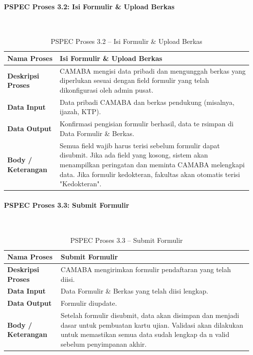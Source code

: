 \paragraph{PSPEC Proses 3.2: Isi Formulir \& Upload Berkas}~\\
\begin{longtable}{|p{}|p{}|}
	\caption{PSPEC Proses 3.2 -- Isi Formulir \& Upload Berkas}
	\label{table:3.pspec32}\\
	\hline
	\textbf{Nama Proses} & Isi Formulir \& Upload Berkas \\
	\hline
	\textbf{Deskripsi Proses} & CAMABA mengisi data pribadi dan mengunggah berkas yang diperlukan sesuai dengan field formulir yang telah dikonfigurasi oleh admin pusat. \\
	\hline
	\textbf{Data Input} & Data pribadi CAMABA dan berkas pendukung (misalnya, ijazah, KTP). \\
	\hline
	\textbf{Data Output} & Konfirmasi pengisian formulir berhasil, data te rsimpan di Data Formulir \& Berkas. \\
	\hline
	\textbf{Body / Keterangan} & Semua field wajib harus terisi sebelum formulir dapat disubmit. Jika ada field yang kosong, sistem akan menampilkan peringatan dan meminta CAMABA melengkapi data. Jika formulir kedokteran, fakultas akan otomatis terisi "Kedokteran". \\
	\hline
\end{longtable}


\paragraph{PSPEC Proses 3.3: Submit Formulir}~\\
\begin{longtable}{|p{}|p{}|}
	\caption{PSPEC Proses 3.3 -- Submit Formulir}
	\label{table:3.pspec33}\\
	\hline
	\textbf{Nama Proses} & Submit Formulir \\
	\hline
	\textbf{Deskripsi Proses} & CAMABA mengirimkan formulir pendaftaran yang telah diisi. \\
	\hline
	\textbf{Data Input} & Data Formulir \& Berkas yang telah diisi lengkap. \\
	\hline
	\textbf{Data Output} & Formulir diupdate. \\
	\hline
	\textbf{Body / Keterangan} & Setelah formulir disubmit, data akan disimpan dan menjadi dasar untuk pembuatan kartu ujian. Validasi akan dilakukan untuk memastikan semua data sudah lengkap da n valid sebelum penyimpanan akhir. \\
	\hline
\end{longtable}


